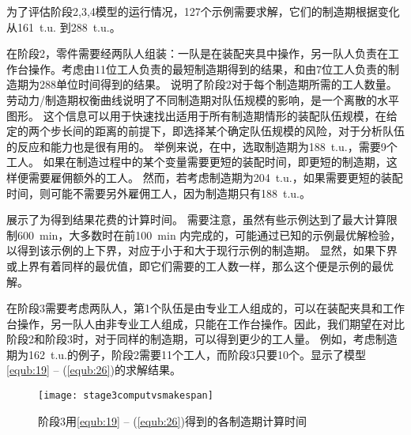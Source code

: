为了评估阶段2,3,4模型的运行情况，127个示例需要求解，它们的制造期根据变化从161\ t.u. 到288\ t.u.。

在阶段2，零件需要经两队人组装：一队是在装配夹具中操作，另一队人负责在工作台操作。考虑由11位工人负责的最短制造期得到的结果，和由7位工人负责的制造期为288单位时间得到的结果。
说明了阶段2对于每个制造期所需的工人数量。劳动力/制造期权衡曲线说明了不同制造期对队伍规模的影响，是一个离散的水平图形。
这个信息可以用于快速找出适用于所有制造期情形的装配队伍规模，在给定的两个步长间的距离的前提下，即选择某个确定队伍规模的风险，对于分析队伍的反应和能力也是很有用的。
举例来说，在中，选取制造期为188\ t.u.，需要9个工人。
如果在制造过程中的某个变量需要更短的装配时间，即更短的制造期，这样便需要雇佣额外的工人。
然而，若考虑制造期为204\ t.u.，如果需要更短的装配时间，则可能不需要另外雇佣工人，因为制造期只有188\ t.u.。
\begin{figure}[h]
\begin{floatrow}[2]
\centering
{}
\end{floatrow}
\end{figure}

展示了为得到结果花费的计算时间。
需要注意，虽然有些示例达到了最大计算限制600\ min，大多数时在前100\ min 内完成的，可能通过已知的示例最优解检验，以得到该示例的上下界，对应于小于和大于现行示例的制造期。
显然，如果下界或上界有着同样的最优值，即它们需要的工人数一样，那么这个便是示例的最优解。

在阶段3需要考虑两队人，第1个队伍是由专业工人组成的，可以在装配夹具和工作台操作，另一队人由非专业工人组成，只能在工作台操作。因此，我们期望在对比阶段2和阶段3时，对于同样的制造期，可以得到更少的工人量。
例如，考虑制造期为162\ t.u.的例子，阶段2需要11个工人，而阶段3只要10个。显示了模型\eqref{equb:19} -- (\ref{equb:26})的求解结果。
\begin{figure}[h]
\centering\caption{阶段3用\eqref{equb:19} -- (\ref{equb:26})得到的各制造期计算时间\label{fig:stage3computationalvsmakespan}}
\texttt{[image: stage3computvsmakespan]}
\end{figure}

